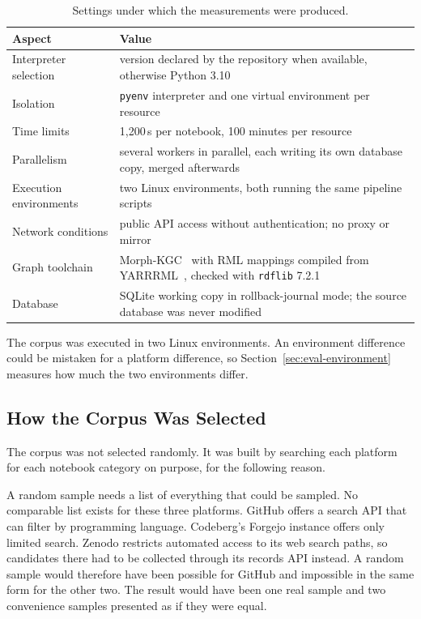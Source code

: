 \begin{table}[htbp]
\centering
\caption{Settings under which the measurements were produced.}
\label{tab:eval-setup}
\small
\begin{tabularx}{\textwidth}{@{}>{\raggedright\arraybackslash}p{4.0cm}X@{}}
\toprule
Aspect & Value\tabularnewline
\midrule
Interpreter selection & version declared by the repository when available, otherwise Python 3.10\tabularnewline
Isolation & \texttt{pyenv} interpreter and one virtual environment per resource\tabularnewline
Time limits & 1{,}200\,s per notebook, 100 minutes per resource\tabularnewline
Parallelism & several workers in parallel, each writing its own database copy, merged afterwards\tabularnewline
Execution environments & two Linux environments, both running the same pipeline scripts\tabularnewline
Network conditions & public API access without authentication; no proxy or mirror\tabularnewline
Graph toolchain & Morph-KGC~\cite{arenas2024morph} with RML mappings compiled from YARRRML~\cite{heyvaert2018yarrrml}, checked with \texttt{rdflib} 7.2.1\tabularnewline
Database & SQLite working copy in rollback-journal mode; the source database was never modified\tabularnewline
\bottomrule
\end{tabularx}
\end{table}

The corpus was executed in two Linux environments. An environment difference could be mistaken for a platform difference, so Section~\ref{sec:eval-environment} measures how much the two environments differ.

\subsection{How the Corpus Was Selected}
\label{sec:eval-corpus}

The corpus was not selected randomly. It was built by searching each platform for each notebook category on purpose, for the following reason.

A random sample needs a list of everything that could be sampled. No comparable list exists for these three platforms. GitHub offers a search API that can filter by programming language. Codeberg's Forgejo instance offers only limited search. Zenodo restricts automated access to its web search paths, so candidates there had to be collected through its records API instead. A random sample would therefore have been possible for GitHub and impossible in the same form for the other two. The result would have been one real sample and two convenience samples presented as if they were equal.

